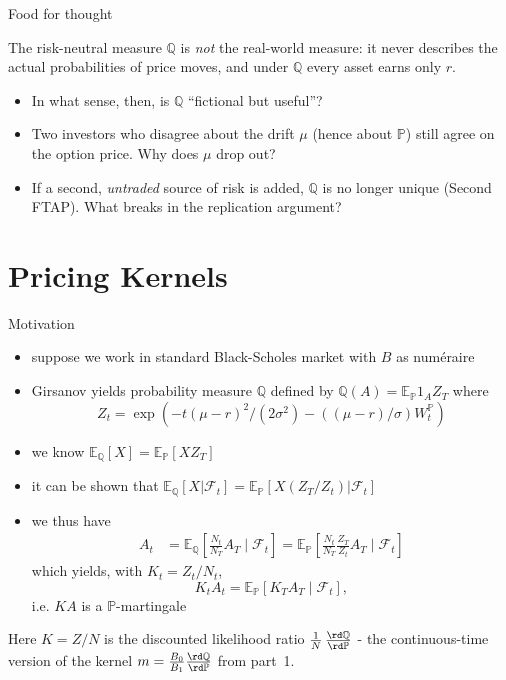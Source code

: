 \documentclass[pdf, handout]{beamer}
\begin{document}
\begin{frame}{Food for thought}
\begin{fftbox}
The risk-neutral measure $\mathbb{Q}$ is \emph{not} the real-world measure: it never describes the actual probabilities of price moves, and under $\mathbb{Q}$ every asset earns only $r$.
\begin{itemize}
\item In what sense, then, is $\mathbb{Q}$ ``fictional but useful''?
\item Two investors who disagree about the drift $\mu$ (hence about $\mathbb{P}$) still agree on the option price. Why does $\mu$ drop out?
\item If a second, \emph{untraded} source of risk is added, $\mathbb{Q}$ is no longer unique (Second FTAP). What breaks in the replication argument?
\end{itemize}
\end{fftbox}
\end{frame}

\section{Pricing Kernels}

\begin{frame}{Motivation}
\begin{itemize}
\item
suppose we work in standard Black-Scholes market with $B$ as num\'eraire
\item Girsanov yields probability measure $\mathbb{Q}$ defined by $\mathbb{Q}(A) = \mathbb{E}_{\mathbb{P}} 1_A Z_T$ where
\[
Z_t = \exp\left( - t (\mu-r)^2/(2\sigma^2) 
- ((\mu-r)/\sigma    ) W_t^{\mathbb{P}}
\right)
\]
\item we know 
$\mathbb{E}_{\mathbb{Q}}[ X ]
= \mathbb{E}_{\mathbb{P}}[ X Z_T ]$
\item it can be shown that
$\mathbb{E}_{\mathbb{Q}}[ X |\mathcal{F}_t]
= \mathbb{E}_{\mathbb{P}}[ X (Z_T/Z_t) |\mathcal{F}_t]$
\item we thus have
\begin{align*}
A_t 
&= \mathbb{E}_{\mathbb{Q}}\left[ \frac{N_t}{N_T} A_T \mid \mathcal{F}_t
\right]
=
\mathbb{E}_{\mathbb{P}}\left[ \frac{N_t}{N_T} \frac{ Z_T}{Z_t} A_T \mid \mathcal{F}_t
\right]
\end{align*}
which yields, with $K_t= Z_t / N_t$,
\[
K_t A_t  =\mathbb{E}_{\mathbb{P}}[ K_T A_T \mid
\mathcal{F}_t],
\]
i.e. $KA$ is a $\mathbb{P}$-martingale
\end{itemize}
\smallskip
{\small Here $K=Z/N$ is the discounted likelihood ratio $\tfrac1N\,\tfrac{\rd\mathbb{Q}}{\rd\mathbb{P}}$ - the continuous-time version of the kernel $m=\tfrac{B_0}{B_1}\tfrac{\rd\mathbb{Q}}{\rd\mathbb{P}}$ from part~1.}
\end{frame}
\end{document}
